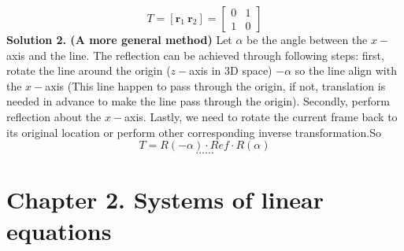 \documentclass[11pt, a4paper]{article}
\begin{document}
\begin{equation*}
    T=
    [\textbf{r$_1$} \: \textbf{r$_2$}] =
    \begin{bmatrix}
    0 & 1 \\
    1 & 0
    \end{bmatrix}
\end{equation*}
\textbf{Solution 2. (A more general method)}  Let $\alpha$ be the angle between the $x-$axis and the line. The reflection can be achieved through following steps: first, rotate the line around the origin ($z-$axis in 3D space) $-\alpha$ so the line align with the $x-$axis (This line happen to pass through the origin, if not, translation is needed in advance to make the line pass through the origin). Secondly, perform reflection about the $x-$axis. Lastly, we need to rotate the current frame back to its original location or perform other corresponding inverse transformation.So 
\begin{equation}
    T = R(-\alpha)\cdot Ref \cdot R(\alpha)
\end{equation}
$$......$$
\section*{Chapter 2. Systems of linear equations}
\end{document}
